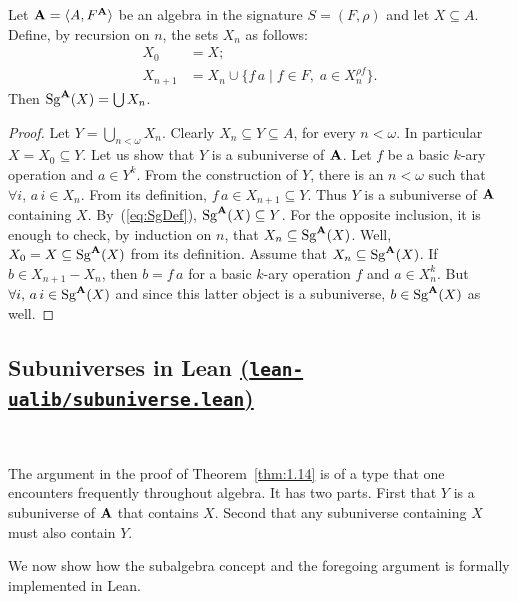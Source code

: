 \documentclass[11pt]{amsart}  %
\begin{document}
\begin{theorem} 
\label{thm:1.14} Let $\mathbf{A}  = \langle A,F^{\mathbf{A}}\rangle$  be  an  algebra in the signature 
$S = (F, \rho)$ and let $X \subseteq A$.  
Define, by recursion on $n$, the sets $X_n$ as follows:
\begin{align}
 X_0  &=  X;\label{def:subalgebra-inductive-1} \\
 X_{n+1} &=  X_n  \cup \{ f \,a  \mid f \in F, \; a \in X_n^{\rho f}\}.\label{def:subalgebra-inductive-2}
\end{align} 
Then  $\operatorname{Sg}^{\mathbf{A}}(X) =  \bigcup X_n$.
\end{theorem}
\begin{proof}
Let  $Y  =  \bigcup_{n<\omega} X_n$.  Clearly  $X_n \subseteq Y \subseteq A$, for  every 
$n< \omega$.  In  particular $X = X_0\subseteq Y$.  
Let us show that $Y$  is  a  subuniverse  of  $\mathbf{A}$.  
Let  $f$ be  a  basic  $k$-ary operation  and  $a \in Y^k$.  
From  the  construction  of  $Y$,  there  is  an  $n < \omega$
such  that $\forall i,\, a\,i \in X_n$.  From  its  definition,  
$f\, a \in X_{n+1} \subseteq Y$. 
Thus  $Y$ is  a  subuniverse  of  $\mathbf{A}$  containing  $X$.  
By~(\ref{eq:SgDef}), $\operatorname{Sg}^{\mathbf{A}}(X) \subseteq Y$.
For  the  opposite  inclusion,  it  is  enough  to  check,  by  induction  on $n$,  that 
$X_n \subseteq  \operatorname{Sg}^{\mathbf{A}}(X)$.  Well, $X_0  =  X  \subseteq  \operatorname{Sg}^{\mathbf{A}}(X)$  from  its  definition.  Assume  that $X_n \subseteq  \operatorname{Sg}^{\mathbf{A}}(X)$.  
If  $b \in X_{n+1}- X_n$,  then  $b  =  f \, a$ for a basic  $k$-ary 
operation $f$ and  $a \in X_n^k$.  But  $\forall i, \, a\, i  \in  \operatorname{Sg}^{\mathbf{A}}(X)$  and  since  this latter  object  is  a  subuniverse,  $b\in  \operatorname{Sg}^{\mathbf{A}}(X)$  as  well.
\end{proof}

\subsection{Subuniverses in Lean \href{https://github.com/UniversalAlgebra/lean-ualib/blob/master/src/subuniverse.lean}{(\lstinline{lean-ualib/subuniverse.lean})}}
\label{sec:subuniverses-in-lean}\

\noindent The argument in the proof of Theorem~\ref{thm:1.14} is  of  a  type  that one encounters frequently throughout algebra.  It has two parts. First  that $Y$ is a subuniverse of $\mathbf{A}$ that contains $X$. Second that any  subuniverse containing $X$ must also contain $Y$.  

We now show how the subalgebra concept and the foregoing argument is formally implemented in Lean.
\end{document}
